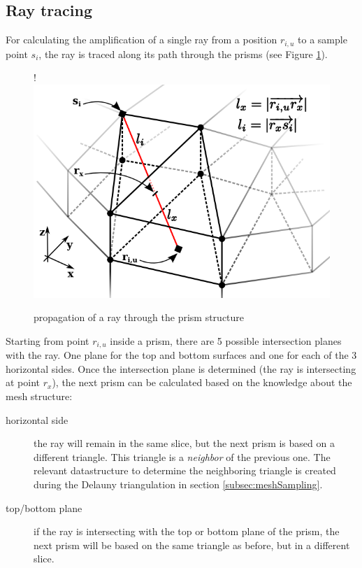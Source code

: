 \subsection{Ray tracing}
\label{subsec:raytracing}

For calculating the amplification of a single ray from a position $r_{i,u}$ to a sample
point $s_i$, the ray is traced along its path through the prisms (see Figure
\ref{graphic:prism_propagation}). 

\begin{figure}[H]
  \centerline{
     {!} {\includegraphics{./graphics/prism_propagation_4.png}}
  }
  \caption{propagation of a ray through the prism structure}
  \label{graphic:prism_propagation}
\end{figure}

Starting from point $r_{i,u}$ inside a prism, there are 5 possible intersection
planes with the ray. One plane for the top and bottom surfaces and one for each
of the 3 horizontal sides. Once the intersection plane is determined (the ray is
intersecting at point $r_x$), the next prism can be calculated based on the
knowledge about the mesh structure:

\begin{description}

  \item[horizontal side]
    the ray will remain in the same slice, but the next prism is based on a
    different triangle. This triangle is a \emph{neighbor} of the previous one.
    The relevant datastructure to determine the neighboring triangle is created
    during the Delauny triangulation in section \ref{subsec:meshSampling}.

  \item[top/bottom plane]
    if the ray is intersecting with the top or bottom plane of the prism, the
    next prism will be based on the same triangle as before, but in a different
    slice.

\end{description}

